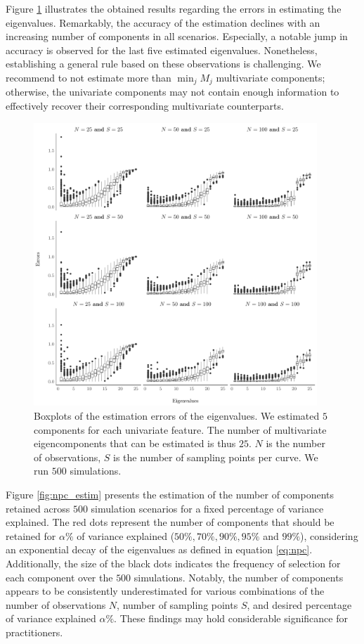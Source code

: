 Figure \ref{fig:ncomp} illustrates the obtained results regarding the errors in estimating the eigenvalues. Remarkably, the accuracy of the estimation declines with an increasing number of components in all scenarios. Especially, a notable jump in accuracy is observed for the last five estimated eigenvalues. Nonetheless, establishing a general rule based on these observations is challenging. We recommend to not estimate more than $\min_j M_j$ multivariate components; otherwise, the univariate components may not contain enough information to effectively recover their corresponding multivariate counterparts.
\begin{figure}
     \centering
    \includegraphics[width=0.95\textwidth]{figures/ncomp.pdf}
    \caption{Boxplots of the estimation errors of the eigenvalues. We estimated $5$ components for each univariate feature. The number of multivariate eigencomponents that can be estimated is thus $25$. $N$ is the number of observations, $S$ is the number of sampling points per curve. We run $500$ simulations.}
    \label{fig:ncomp}
\end{figure}
Figure \ref{fig:npc_estim} presents the estimation of the number of components retained across $500$ simulation scenarios for a fixed percentage of variance explained. The red dots represent the number of components that should be retained for $\alpha\%$ of variance explained ($50\%, 70\%, 90\%, 95\%$ and $99\%$), considering an exponential decay of the eigenvalues as defined in equation \eqref{eq:npc}. Additionally, the size of the black dots indicates the frequency of selection for each component over the $500$ simulations. Notably, the number of components appears to be consistently underestimated for various combinations of the number of observations $N$, number of sampling points $S$, and desired percentage of variance explained $\alpha\%$. These findings may hold considerable significance for practitioners.
